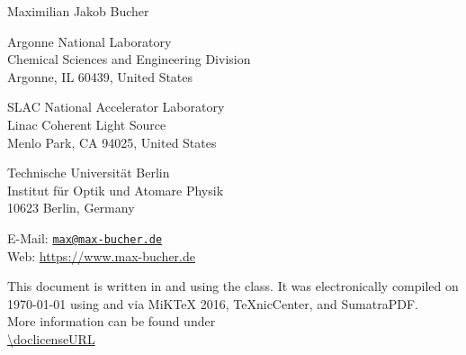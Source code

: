 \begin{flushleft}
{\Large Maximilian Jakob Bucher}\\
\footnotesize{Argonne National Laboratory\\
Chemical Sciences and Engineering Division\\
Argonne, IL 60439, United States\\
\vspace{0.5cm}
\thispagestyle{empty}

SLAC National Accelerator Laboratory\\
Linac Coherent Light Source\\
Menlo Park, CA 94025, United States
\vspace{0.5cm}

Technische Universität Berlin\\
Institut für Optik und Atomare Physik\\
10623 Berlin, Germany
\vspace{0.5cm}

E-Mail: \href{mailto:max@max-bucher.de}{\nolinkurl{max@max-bucher.de} }\\
Web: \url{https://www.max-bucher.de}}
\end{flushleft}
%
%
%
\vspace{7.5cm}
\footnotesize{This document is written in  and  using the  class. It was electronically compiled on {\isodate\today} using  and  via MiKTeX 2016, TeXnicCenter, and SumatraPDF.}\\
%
\null \vspace{1cm}
%
\normalsize{\doclicenseThis
More information can be found under\\
\url{\doclicenseURL}}
